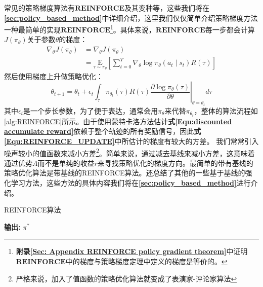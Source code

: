 常见的策略梯度算法有$\mathbf{REINFORCE} $及其变种等，这些我们将在\textbf{\ref{sec:policy_based_method}}中详细介绍，这里我们仅仅简单介绍策略梯度方法一种最简单的实现$\mathbf{REINFORCE} $\footnote{\textbf{附录\ref{Sec: Appendix REINFORCE policy gradient theorem}}中证明$\mathbf{REINFORCE} $中的梯度与策略梯度定理中定义的梯度是等价的。}。具体来说，$\mathbf{REINFORCE} $每一步都会计算$J(\pi_{\theta})$关于参数$\theta$的梯度：
\begin{equation}
    \begin{aligned}
\nabla_{\theta} J\left(\pi_{\theta}\right) &=\nabla_{\theta} J\left(\pi_{\theta}\right) \\
&=\underset{\tau \sim \pi_{\theta}}{\mathrm{E}}\left[\sum_{t=0}^{T} \nabla_{\theta} \log \pi_{\theta}\left(a_{t} \mid s_{t}\right) R(\tau)\right]
    \end{aligned}
\end{equation}
然后使用梯度上升做策略优化：
\begin{equation}
    \theta_{t+1}=\theta_{t}+\left.\epsilon_{t} \int_{\tau} \pi_{\theta_{t}}(\tau) R(\tau) \frac{\partial \log \pi_{\theta}(\tau)}{\partial \theta}\right|_{\theta=\theta_{t}} d \tau
    \label{Equ:REINFORCE_UPDATE}
\end{equation}
其中$\epsilon_{t}$是一个步长参数，为了便于表达，通常会用$\pi_{\theta}$来代替$\pi_{\theta_{t}}$，整体的算法流程如\ref{alg:REINFORCE}所示。由于使用蒙特卡洛方法估计\textbf{式\eqref{Equ:discounted accumulate reward}}依赖于整个轨迹的所有奖励信号，因此\textbf{式\eqref{Equ:REINFORCE_UPDATE}}中所估计的梯度有较大的方差。 我们常常引入噪声较小的值函数来减小方差\footnote{严格来说，加入了值函数的策略优化算法就变成了表演家-评论家算法}。简单来说，通过减去基线来减小方差，这意味着通过优势$A$而不是单纯的收益$r$来寻找策略优化的梯度方向。最简单的带有基线的策略优化算法是带基线的REINFORCE算法。还总结了其他的一些基于基线的强化学习方法，这些方法的具体内容我们将在\textbf{\ref{sec:policy_based_method}}进行介绍。

\begin{algorithm}[htpb]
	\caption{REINFORCE算法}
	\label{alg:REINFORCE}
	\begin{algorithmic}[1]
		\ENDFOR
		\ENDWHILE
	\end{algorithmic}
	\hspace*{0.02in} {\bf 输出:} $\pi^{*}$
\end{algorithm}


